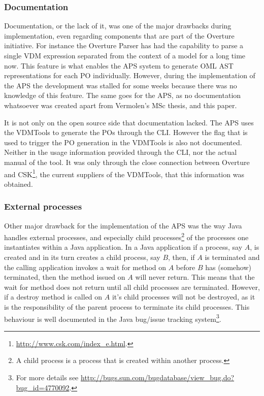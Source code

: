 \documentclass[]{article}
\begin{document}
\subsubsection{Documentation}
Documentation, or the lack of it, was one of the major drawbacks during implementation, even regarding components that are part of the Overture initiative.
For instance the Overture Parser has had the capability to parse a single VDM expression separated from the context of a model for a long time now.
This feature is what enables the APS system to generate OML AST representations for each PO individually.
However, during the implementation of the APS the development was stalled for some weeks because there was no knowledge of this feature.
The same goes for the APS, as no documentation whatsoever was created apart from Vermolen's MSc thesis, and this paper.

It is not only on the open source side that documentation lacked. 
The APS uses the VDMTools to generate the POs through the CLI.
However the flag that is used to trigger the PO generation in the VDMTools is also not documented.
Neither in the usage information provided through the CLI, nor the actual manual of the tool.
It was only through the close connection between Overture and CSK\footnote{\url{http://www.csk.com/index_e.html}.}, the current suppliers of the VDMTools, that this information was obtained.

\subsubsection{External processes}
Other major drawback for the implementation of the APS was the way Java handles external processes, and especially child processes\footnote{A child process is a process that is created within another process.} of the processes one instantiates within a Java application.
In a Java application if a process, say $A$, is created and in its turn creates a child process, say $B$, then, if $A$ is terminated and the calling application invokes a wait for method on $A$ before $B$ has (somehow) terminated, then the method issued on $A$ will never return.
This means that the wait for method does not return until all child processes are terminated.
However, if a destroy method is called on $A$ it's child processes will not be destroyed, as it is the responsibility of the parent process to terminate its child processes.
This behaviour is well documented in the Java bug/issue tracking system\footnote{For more details see \url{http://bugs.sun.com/bugdatabase/view_bug.do?bug_id=4770092}.}.
\end{document}
